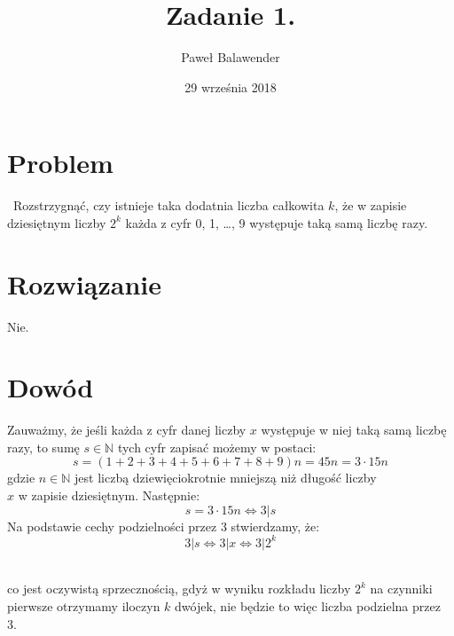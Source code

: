 \documentclass[11pt]{article}
\title{Zadanie 1.}
\date{29 września 2018}
\author{Paweł Balawender}
\begin{document}
\maketitle

\section*{Problem}\
Rozstrzygnąć, czy istnieje taka dodatnia liczba całkowita $k$, że w zapisie dziesiętnym liczby $2^k$ każda z cyfr 0, 1,  \ldots, 9 występuje taką samą liczbę razy.
\section*{Rozwiązanie}
Nie.
\section*{Dowód}
Zauważmy, że jeśli każda z cyfr danej liczby $x$ występuje w niej taką samą liczbę razy, to sumę $s \in\mathbb{N}$ tych cyfr zapisać możemy w postaci:
\begin{equation}
s=(1+2+3+4+5+6+7+8+9)n = 45n = 3 \cdot 15n
\end{equation}
gdzie $n\in\mathbb{N}$ jest liczbą dziewięciokrotnie mniejszą niż długość liczby\\
$x$ w zapisie dziesiętnym. Następnie:
\begin{equation}
s = 3 \cdot 15n \iff 3|s
\end{equation}
Na podstawie cechy podzielności przez 3 stwierdzamy, że:
\begin{equation}
3|s \iff 3|x \iff 3|2^k
\end{equation}\

co jest oczywistą sprzecznością, gdyż w wyniku rozkładu liczby $2^k$ na czynniki pierwsze otrzymamy iloczyn $k$ dwójek, nie będzie to więc liczba podzielna przez 3.\\
\end{document}
